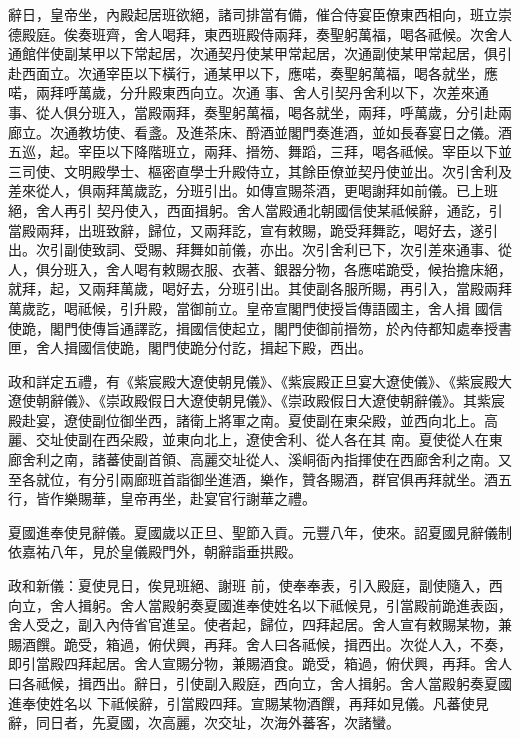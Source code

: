\begin{pinyinscope}
 辭日，皇帝坐，內殿起居班欲絕，諸司排當有備，催合侍宴臣僚東西相向，班立崇德殿庭。俟奏班齊，舍人喝拜，東西班殿侍兩拜，奏聖躬萬福，喝各祗候。次舍人通館伴使副某甲以下常起居，次通契丹使某甲常起居，次通副使某甲常起居，俱引赴西面立。次通宰臣以下橫行，通某甲以下，應喏，奏聖躬萬福，喝各就坐，應喏，兩拜呼萬歲，分升殿東西向立。次通
 事、舍人引契丹舍利以下，次差來通事、從人俱分班入，當殿兩拜，奏聖躬萬福，喝各就坐，兩拜，呼萬歲，分引赴兩廊立。次通教坊使、看盞。及進茶床、酹酒並閣門奏進酒，並如長春宴日之儀。酒五巡，起。宰臣以下降階班立，兩拜、搢笏、舞蹈，三拜，喝各祗候。宰臣以下並三司使、文明殿學士、樞密直學士升殿侍立，其餘臣僚並契丹使並出。次引舍利及差來從人，俱兩拜萬歲訖，分班引出。如傳宣賜茶酒，更喝謝拜如前儀。已上班絕，舍人再引
 契丹使入，西面揖躬。舍人當殿通北朝國信使某祗候辭，通訖，引當殿兩拜，出班致辭，歸位，又兩拜訖，宣有敕賜，跪受拜舞訖，喝好去，遂引出。次引副使致詞、受賜、拜舞如前儀，亦出。次引舍利已下，次引差來通事、從人，俱分班入，舍人喝有敕賜衣服、衣著、銀器分物，各應喏跪受，候抬擔床絕，就拜，起，又兩拜萬歲，喝好去，分班引出。其使副各服所賜，再引入，當殿兩拜萬歲訖，喝祗候，引升殿，當御前立。皇帝宣閣門使授旨傳語國主，舍人揖
 國信使跪，閣門使傳旨通譯訖，揖國信使起立，閣門使御前搢笏，於內侍都知處奉授書匣，舍人揖國信使跪，閣門使跪分付訖，揖起下殿，西出。



 政和詳定五禮，有《紫宸殿大遼使朝見儀》、《紫宸殿正旦宴大遼使儀》、《紫宸殿大遼使朝辭儀》、《崇政殿假日大遼使朝見儀》、《崇政殿假日大遼使朝辭儀》。其紫宸殿赴宴，遼使副位御坐西，諸衛上將軍之南。夏使副在東朵殿，並西向北上。高麗、交址使副在西朵殿，並東向北上，遼使舍利、從人各在其
 南。夏使從人在東廊舍利之南，諸蕃使副首領、高麗交址從人、溪峒衙內指揮使在西廊舍利之南。又至各就位，有分引兩廊班首詣御坐進酒，樂作，贊各賜酒，群官俱再拜就坐。酒五行，皆作樂賜華，皇帝再坐，赴宴官行謝華之禮。



 夏國進奉使見辭儀。夏國歲以正旦、聖節入貢。元豐八年，使來。詔夏國見辭儀制依嘉祐八年，見於皇儀殿門外，朝辭詣垂拱殿。



 政和新儀：夏使見日，俟見班絕、謝班
 前，使奉奉表，引入殿庭，副使隨入，西向立，舍人揖躬。舍人當殿躬奏夏國進奉使姓名以下祗候見，引當殿前跪進表函，舍人受之，副入內侍省官進呈。使者起，歸位，四拜起居。舍人宣有敕賜某物，兼賜酒饌。跪受，箱過，俯伏興，再拜。舍人曰各祗候，揖西出。次從人入，不奏，即引當殿四拜起居。舍人宣賜分物，兼賜酒食。跪受，箱過，俯伏興，再拜。舍人曰各祗候，揖西出。辭日，引使副入殿庭，西向立，舍人揖躬。舍人當殿躬奏夏國進奉使姓名以
 下祗候辭，引當殿四拜。宣賜某物酒饌，再拜如見儀。凡蕃使見辭，同日者，先夏國，次高麗，次交址，次海外蕃客，次諸蠻。




\end{pinyinscope}
